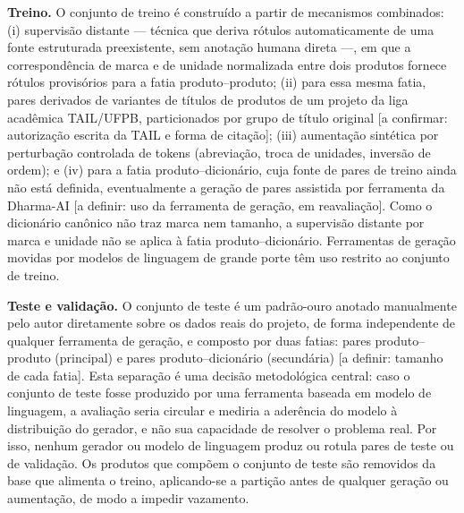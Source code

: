 \documentclass[
    article,
    12pt,
    oneside,
    a4paper,
    english,
    brazilian
    ]{abntex2}
\numberwithin{equation}{section}
\begin{document}
\textbf{Treino.} O conjunto de treino é construído a partir de mecanismos combinados: (i) supervisão distante --- técnica que deriva rótulos automaticamente de uma fonte estruturada preexistente, sem anotação humana direta ---, em que a correspondência de marca e de unidade normalizada entre dois produtos fornece rótulos provisórios para a fatia produto--produto; (ii) para essa mesma fatia, pares derivados de variantes de títulos de produtos de um projeto da liga acadêmica TAIL/UFPB, particionados por grupo de título original [a confirmar: autorização escrita da TAIL e forma de citação]; (iii) aumentação sintética por perturbação controlada de tokens (abreviação, troca de unidades, inversão de ordem); e (iv) para a fatia produto--dicionário, cuja fonte de pares de treino ainda não está definida, eventualmente a geração de pares assistida por ferramenta da Dharma-AI [a definir: uso da ferramenta de geração, em reavaliação]. Como o dicionário canônico não traz marca nem tamanho, a supervisão distante por marca e unidade não se aplica à fatia produto--dicionário. Ferramentas de geração movidas por modelos de linguagem de grande porte têm uso restrito ao conjunto de treino.

\textbf{Teste e validação.} O conjunto de teste é um padrão-ouro anotado manualmente pelo autor diretamente sobre os dados reais do projeto, de forma independente de qualquer ferramenta de geração, e composto por duas fatias: pares produto--produto (principal) e pares produto--dicionário (secundária) [a definir: tamanho de cada fatia]. Esta separação é uma decisão metodológica central: caso o conjunto de teste fosse produzido por uma ferramenta baseada em modelo de linguagem, a avaliação seria circular e mediria a aderência do modelo à distribuição do gerador, e não sua capacidade de resolver o problema real. Por isso, nenhum gerador ou modelo de linguagem produz ou rotula pares de teste ou de validação. Os produtos que compõem o conjunto de teste são removidos da base que alimenta o treino, aplicando-se a partição antes de qualquer geração ou aumentação, de modo a impedir vazamento.
\end{document}
